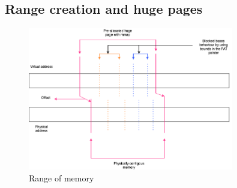

\subsection{Range creation and huge pages}
\begin{figure}[h]
  \includegraphics[width=0.8\textwidth]{diagrams/AllocationOverview24.png}
  \caption{Range of memory}
  \label{fig:RangeOfMemory}
\end{figure}


